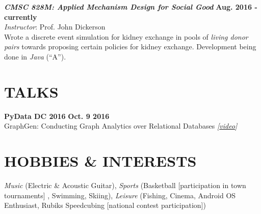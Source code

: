 \documentclass[margin, 10pt]{res} %
\begin{document}
\begin{resume}
{\sl \textbf{CMSC 828M: Applied Mechanism Design for Social Good}} \hfill \textbf{Aug. 2016 - currently}\\
\textit{Instructor}: Prof. John Dickerson\\
Wrote a discrete event simulation for kidney exchange in pools of \textit{living donor pairs} towards proposing certain policies for kidney exchange.
Development being done in \textit{Java} (``A'').


\section{TALKS}
 \textbf{PyData DC 2016}  \hfill \textbf{Oct. 9 2016}\\
GraphGen: Conducting Graph Analytics over Relational Databases \textit{[\href{https://youtu.be/3pAfRiGmk9o?t=24s}{video}]}

\section{HOBBIES \& INTERESTS}

\textit{Music} (Electric \& Acoustic Guitar), \textit{Sports} (Basketball [participation in town tournaments] , Swimming, Skiing), \textit{Leisure} (Fishing, Cinema, Android OS Enthusiast, Rubiks Speedcubing [national contest participation])


\end{resume}
\end{document}
